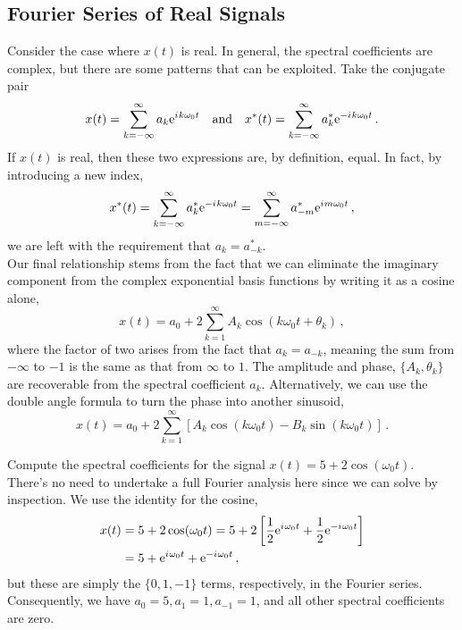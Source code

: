 \subsection{Fourier Series of Real Signals}
%
Consider the case where $x(t)$ is real. In general, the spectral coefficients are
complex, but there are some patterns that can be exploited. Take the conjugate pair
%
\begin{displaymath}
  x(t) = \sum_{k=-\infty}^\infty a_k \mathrm{e}^{{i\mkern1mu} k\omega_0 t}
  \quad\mathrm{and}\quad
  x^*(t) = \sum_{k=-\infty}^\infty a_k^* \mathrm{e}^{-{i\mkern1mu} k\omega_0 t} \,.
\end{displaymath}
%
If $x(t)$ is real, then these two expressions are, by definition, equal. In fact,
by introducing a new index,
%
\begin{displaymath}
  x^*(t) = \sum_{k=-\infty}^\infty a_k^*\mathrm{e}^{-{i\mkern1mu} k \omega_0 t}
  = \sum_{m=-\infty}^\infty a_{-m}^*\mathrm{e}^{{i\mkern1mu} m \omega_0 t} \,,
\end{displaymath}
%
we are left with the requirement that $a_k = a_{-k}^*$.\\
%
Our final relationship stems from the fact that we can eliminate the imaginary
component from the complex exponential basis functions by writing it as a cosine
alone,
%
\begin{displaymath}
  x(t) = a_0 + 2\sum_{k=1}^\infty A_k\cos(k\omega_0 t + \theta_k) \,,
\end{displaymath}
%
where the factor of two arises from the fact that $a_k = a_{-k}$, meaning the
sum from $-\infty$ to $-1$ is the same as that from $\infty$ to $1$. The amplitude
and phase, $\{A_k,\theta_k\}$ are recoverable from the spectral coefficient $a_k$.
Alternatively, we can use the double angle formula to turn the phase into
another sinusoid,
%
\begin{displaymath}
  x(t) = a_0 + 2\sum_{k=1}^\infty \left[A_k\cos(k\omega_0 t) - B_k\sin(k\omega_0 t)\right] \,.  
\end{displaymath}

\begin{exmp}
  Compute the spectral coefficients for the signal $x(t) = 5 + 2\cos(\omega_0 t)$.\\
  There's no need to undertake a full Fourier analysis here since we can
  solve by inspection. We use the identity for the cosine,
  \begin{align*}
    x(t) &= 5 + 2\cos(\omega_0 t) = 5 + 2\left[
      \frac{1}{2}\mathrm{e}^{{i\mkern1mu}\omega_0t} + \frac{1}{2}\mathrm{e}^{-{i\mkern1mu}\omega_0t}
    \right] \\
    &= 5 + \mathrm{e}^{{i\mkern1mu}\omega_0 t} + \mathrm{e}^{-{i\mkern1mu}\omega_0 t} \,,
  \end{align*}
  but these are simply the $\{0,1,-1\}$ terms, respectively, in the Fourier series.
  Consequently, we have $a_0 = 5, a_1 = 1, a_{-1} = 1$, and all other spectral
  coefficients are zero.
\end{exmp}

